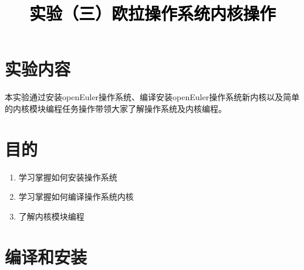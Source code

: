 \documentclass[a4paper,twoside]{article}
\newcommand{\PaperTitle}{实验（三）欧拉操作系统内核操作}  %
\begin{document}
\newpage

\title{
	\Large{\textcolor{black}{\PaperTitle}}
}

\maketitle
	
\tableofcontents
 
\newpage
\setcounter{page}{1}

\begin{spacing}{1.2}

\section{实验内容}

本实验通过安装openEuler操作系统、编译安装openEuler操作系统新内核以及简单的内核模块编程任务操作带领大家了解操作系统及内核编程。  

\section{目的}

\begin{enumerate}
	\item 学习掌握如何安装操作系统
	\item 学习掌握如何编译操作系统内核
	\item 了解内核模块编程
\end{enumerate}

\section{编译和安装}


\end{spacing}
\end{document}
